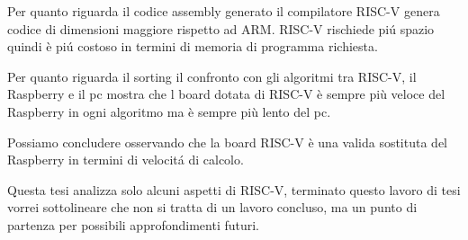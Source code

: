 \documentclass[12pt,a4paper]{report}
\begin{document}


Per quanto riguarda il codice assembly generato il compilatore RISC-V genera codice di dimensioni maggiore rispetto ad ARM. RISC-V rischiede pi\'u spazio quindi è pi\'u costoso in termini di memoria di programma richiesta. 

Per quanto riguarda il sorting il confronto con gli algoritmi tra RISC-V, il Raspberry e il pc mostra che l board dotata di RISC-V è sempre più veloce del Raspberry in ogni algoritmo ma è sempre più lento del pc.

Possiamo concludere osservando che la board RISC-V è una valida sostituta del Raspberry in termini di velocit\'a di calcolo.%

Questa tesi analizza solo alcuni aspetti di RISC-V, terminato questo lavoro di tesi vorrei sottolineare che non si tratta di un lavoro concluso, ma un punto di partenza per possibili approfondimenti futuri.  






\printbibliography 
\end{document}

